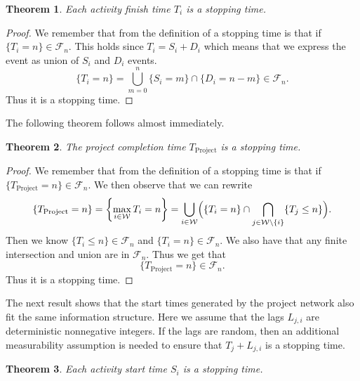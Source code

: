 \documentclass[11pt,a4paper]{article}
\newcommand{\cF}{\mathcal{F}}
\newcommand{\1}{\mathbf{1}}
\theoremstyle{definition}
\theoremstyle{plain}
\newtheorem{theorem}{Theorem}[section]
\theoremstyle{remark}
\numberwithin{equation}{section}
\begin{document}
\begin{theorem}
Each activity finish time $T_i$ is a stopping time.
\end{theorem}

\begin{proof}
We remember that from the definition of a stopping time is that if $\{T_i=n\} \in \cF_{n}$. This holds since $T_i=S_i+D_i$ which means that we express the event as union of $S_i$ and $D_i$ events.
\[
\{T_i=n\} = \bigcup_{m=0}^{n} \{S_i=m\}\cap \{D_i = n-m\} \in \cF_{n}.
\]
Thus it is a stopping time.
\end{proof}

The following theorem follows almost immediately.

\begin{theorem}
The project completion time $T_{\text{Project}}$ is a stopping time.
\end{theorem}

\begin{proof}
We remember that from the definition of a stopping time is that if $\{T_{\text{Project}}=n\} \in \cF_{n}$. We then observe that we can rewrite
\[
\{T_{\text{Project}}=n\}
=
\left\{\max_{i\in\mathcal{W}}T_i = n\right\}
=
\bigcup_{i\in\mathcal{W}}
\Bigl(
\{T_i = n\}
\cap
\bigcap_{j\in\mathcal{W}\setminus \{i\}}
\{T_j \leq n\}
\Bigr).
\]
Then we know $\{T_i \leq n\} \in \cF_n$ and $\{T_i = n\} \in \cF_n$. We also have that any finite intersection and union are in $\cF_n$. Thus we get that
\[
\{T_{\text{Project}}=n\} \in \cF_n.
\]
Thus it is a stopping time.
\end{proof}

The next result shows that the start times generated by the project network also fit the same information structure. Here we assume that the lags $L_{j,i}$ are deterministic nonnegative integers. If the lags are random, then an additional measurability assumption is needed to ensure that $T_j+L_{j,i}$ is a stopping time.

\begin{theorem}
Each activity start time $S_i$ is a stopping time.
\end{theorem}
\end{document}
